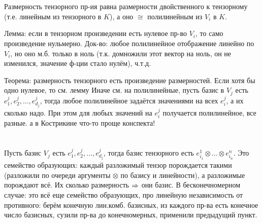 \section{} %
Размерность тензорного пр-ия равна размерности двойственного к тензорному (т.е. линейным из тензорного в $K$),
а оно $\cong$ полилинейным из $V_i$ в $K$.

Лемма: если в тензорном произведении есть нулевое пр-во $V_i$, то само произведение нульмерно.
Док-во: любое полилинейное отображение линейно по $V_i$, но оно м.б. только в ноль (т.к. домножили этот вектор на ноль,
он не изменился, значение ф-ции стало нулём), ч.т.д.

Теорема: размерность тензорного есть произведение размерностей.
Если хотя бы одно нулевое, то см. лемму
Иначе см. на полилинейные, пусть базис в $V_j$ есть $e_1^j, e_2^j, \dots, e_{d_j}^j$, тогда любое полилинейное
задаётся значениями на всех $e_i^j$, а их сколько надо.
При этом для любых значений на $e_i^j$ получается полилинейное, все разные.
\TODO а в Кострикине что-то проще конспекта!

\section{} %
Пусть базис $V_j$ есть $e_1^j, e_2^j, \dots, e_{d_j}^j$,
тогда базис тензорного есть $e_{i_1}^1 \otimes \dots \otimes e_{i_n}^n$.
Это семейство образующих: каждый разложимый тензор порождается такими (разложили по очереди аргументы $\otimes$ по базису и линейности),
а разложимые порождают всё.
Их сколько размерность $\Rightarrow$ они базис.
В бесконечномерном случае: это всё еще семейство образующих, про линейную независимость от противного: берём конечную лин.комб.
базисных, из каждого пр-ва есть конечное число базисных, сузили пр-ва до конечномерных, применили предыдущий пункт.
